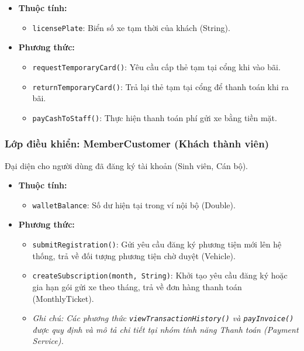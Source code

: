\begin{itemize}
    \item \textbf{Thuộc tính:}
    \begin{itemize}
        \item \texttt{licensePlate}: Biển số xe tạm thời của khách (String).
    \end{itemize}
    \item \textbf{Phương thức:}
    \begin{itemize}
        \item \texttt{requestTemporaryCard()}: Yêu cầu cấp thẻ tạm tại cổng khi vào bãi.
        \item \texttt{returnTemporaryCard()}: Trả lại thẻ tạm tại cổng để thanh toán khi ra bãi.
        \item \texttt{payCashToStaff()}: Thực hiện thanh toán phí gửi xe bằng tiền mặt.
    \end{itemize}
\end{itemize}

\subsubsection{Lớp điều khiển: MemberCustomer (Khách thành viên)}
Đại diện cho người dùng đã đăng ký tài khoản (Sinh viên, Cán bộ).

\begin{itemize}
    \item \textbf{Thuộc tính:}
    \begin{itemize}
        \item \texttt{walletBalance}: Số dư hiện tại trong ví nội bộ (Double).
    \end{itemize}
    \item \textbf{Phương thức:}
    \begin{itemize}
        \item \texttt{submitRegistration()}: Gửi yêu cầu đăng ký phương tiện mới lên hệ thống, trả về đối tượng phương tiện chờ duyệt (Vehicle).
        \item \texttt{createSubscription(month, String)}: Khởi tạo yêu cầu đăng ký hoặc gia hạn gói gửi xe theo tháng, trả về đơn hàng thanh toán (MonthlyTicket).
        \item \textit{Ghi chú: Các phương thức \texttt{viewTransactionHistory()} và \texttt{payInvoice()} được quy định và mô tả chi tiết tại nhóm tính năng Thanh toán (Payment Service).}
    \end{itemize}
\end{itemize}
